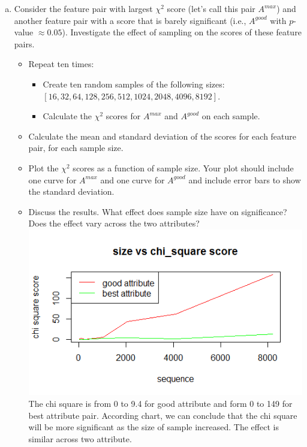 \documentclass[11pt]{article}
\begin{document}
\begin{enumerate}[(a)]
\item Consider the feature pair with largest $\chi^2$ score (let's call this pair $A^{max}$) and another feature pair with a score that is barely significant (i.e., $A^{good}$ with $p$-value $\approx 0.05$). Investigate the effect of sampling on the scores of these feature pairs.
\begin{itemize}
\item Repeat ten times:
\begin{itemize}
\item Create ten random samples of the following sizes: \\ $[16, 32, 64, 128, 256, 512, 1024, 2048, 4096, 8192]$. 
\item Calculate the $\chi^2$ scores for $A^{max}$ and $A^{good}$ on each sample.
\end{itemize}
\item Calculate the mean and standard deviation of the scores for each feature pair, for each sample size.
\item Plot the $\chi^2$ scores as a function of sample size. Your plot should include one curve for $A^{max}$ and one curve for $A^{good}$ and include error bars to show the standard deviation.
\item Discuss the results. What effect does sample size have on significance? Does the effect vary across the two attributes?\\

\includegraphics[width=5in]{chisquare.png}\\
The chi square is from 0 to 9.4 for good attribute and  form 0 to 149 for best attribute pair. According chart, we can conclude that the chi square will be more significant as the size of sample increased. The effect is similar across two attribute.

\end{itemize}

\end{enumerate}
\end{document}
